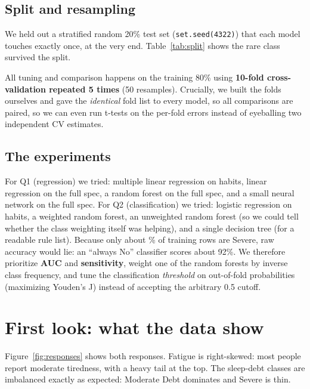 \documentclass[10pt]{article}
\newcommand{\lead}[1]{\par\noindent{\small\emph{Led by #1.}}\par\smallskip}
\begin{document}
\subsection{Split and resampling}
We held out a stratified random 20\% test set (\texttt{set.seed(4322)}) that each model touches exactly once, at the very end. Table~\ref{tab:split} shows the rare class survived the split.

\begin{table}[htbp]
\centering
\caption{Stratified 80/20 split: severe-debt cases are preserved in both sets.}
\label{tab:split}

\end{table}

All tuning and comparison happens on the training 80\% using \textbf{10-fold cross-validation repeated 5 times} (50 resamples). Crucially, we built the folds ourselves and gave the \emph{identical} fold list to every model, so all comparisons are paired, so we can even run t-tests on the per-fold errors instead of eyeballing two independent CV estimates.

\subsection{The experiments}
For Q1 (regression) we tried: multiple linear regression on habits, linear regression on the full spec, a random forest on the full spec, and a small neural network on the full spec. For Q2 (classification) we tried: logistic regression on habits, a weighted random forest, an unweighted random forest (so we could tell whether the class weighting itself was helping), and a single decision tree (for a readable rule list). Because only about \pctSevereTrain\% of training rows are Severe, raw accuracy would lie: an ``always No'' classifier scores about 92\%. We therefore prioritize \textbf{AUC} and \textbf{sensitivity}, weight one of the random forests by inverse class frequency, and tune the classification \emph{threshold} on out-of-fold probabilities (maximizing Youden's J) instead of accepting the arbitrary 0.5 cutoff.

\section{First look: what the data show}
\lead{Haadi Saqib}
Figure~\ref{fig:responses} shows both responses. Fatigue is right-skewed: most people report moderate tiredness, with a heavy tail at the top. The sleep-debt classes are imbalanced exactly as expected: Moderate Debt dominates and Severe is thin.
\end{document}
